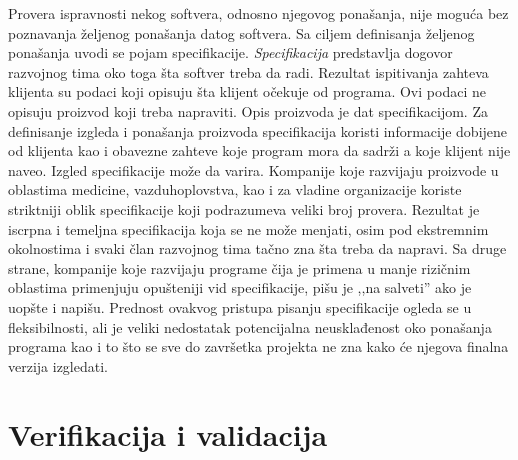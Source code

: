 \documentclass[12pt,oneside]{memoir}
\begin{document}
Provera ispravnosti nekog softvera, odnosno njegovog ponašanja, nije moguća bez poznavanja željenog ponašanja datog softvera. Sa ciljem definisanja željenog ponašanja uvodi se pojam specifikacije. \textit{Specifikacija} predstavlja dogovor razvojnog tima oko toga šta softver treba da radi. Rezultat ispitivanja zahteva klijenta su podaci koji opisuju šta klijent očekuje od programa. Ovi podaci ne opisuju proizvod koji treba napraviti. Opis proizvoda je dat specifikacijom. Za definisanje izgleda i ponašanja proizvoda specifikacija koristi informacije dobijene od klijenta kao i obavezne zahteve koje program mora da sadrži a koje klijent nije naveo. Izgled specifikacije može da varira. Kompanije koje razvijaju proizvode u oblastima medicine, vazduhoplovstva, kao i za vladine organizacije koriste striktniji oblik specifikacije koji podrazumeva veliki broj provera. Rezultat je iscrpna i temeljna specifikacija koja se ne može menjati, osim pod ekstremnim okolnostima i svaki član razvojnog tima tačno zna šta treba da napravi. Sa druge strane, kompanije koje razvijaju programe čija je primena u manje rizičnim oblastima primenjuju opušteniji vid specifikacije, pišu je ,,na salveti'' ako je uopšte i napišu. Prednost ovakvog pristupa pisanju specifikacije ogleda se u fleksibilnosti, ali je veliki nedostatak potencijalna neusklađenost oko ponašanja programa kao i to što se sve do završetka projekta ne zna kako će njegova finalna verzija izgledati. \cite{mvj, SoftTest}


\section{Verifikacija i validacija}
\end{document}
